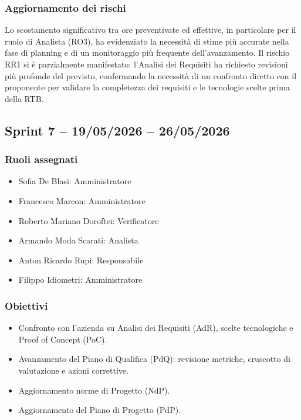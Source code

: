\subsubsection{Aggiornamento dei rischi}
Lo scostamento significativo tra ore preventivate ed effettive, in particolare
per il ruolo di Analista (RO3), ha evidenziato la necessità di stime più accurate
nella fase di planning e di un monitoraggio più frequente dell'avanzamento.
Il rischio RR1 si è parzialmente manifestato: l'Analisi dei Requisiti ha richiesto
revisioni più profonde del previsto, confermando la necessità di un confronto
diretto con il proponente per validare la completezza dei requisiti e le tecnologie
scelte prima della RTB.

\subsection{Sprint 7 -- 19/05/2026 -- 26/05/2026}
\label{sec:sprint7}

\subsubsection{Ruoli assegnati}
\begin{itemize}
    \item Sofia De Blasi: Amministratore
    \item Francesco Marcon: Amministratore
    \item Roberto Mariano Doroftei: Verificatore
    \item Armando Moda Scarati: Analista
    \item Anton Ricardo Rupi: Responsabile
    \item Filippo Idiometri: Amministratore
\end{itemize}

\subsubsection{Obiettivi}
\begin{itemize}
    \item Confronto con l'azienda su Analisi dei Requisiti (AdR), scelte tecnologiche e Proof of Concept (PoC).
    \item Avanzamento del Piano di Qualifica (PdQ): revisione metriche, cruscotto di valutazione e azioni correttive.
    \item Aggiornamento norme di Progetto (NdP).
    \item Aggiornamento del Piano di Progetto (PdP).
\end{itemize}

